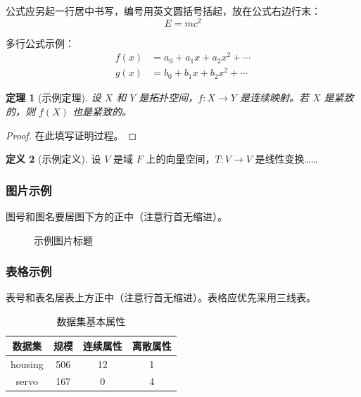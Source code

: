 \documentclass[a4paper,12pt,openright]{book}
\newtheorem{thm}{定理}[section]
\theoremstyle{definition}
\newtheorem{dfn}[thm]{定义}
\theoremstyle{remark}
\begin{document}
公式应另起一行居中书写，编号用英文圆括号括起，放在公式右边行末：
\begin{equation}
    E = mc^{2}
\end{equation}

多行公式示例：
\begin{align}
    f(x) &= a_{0} + a_{1}x + a_{2}x^{2} + \cdots \\
    g(x) &= b_{0} + b_{1}x + b_{2}x^{2} + \cdots
\end{align}

\begin{thm}[示例定理]
    设 $X$ 和 $Y$ 是拓扑空间，$f: X \to Y$ 是连续映射。若 $X$ 是紧致的，则 $f(X)$ 也是紧致的。
\end{thm}

\begin{proof}
    在此填写证明过程。
\end{proof}

\begin{dfn}[示例定义]
    设 $V$ 是域 $F$ 上的向量空间，$T: V \to V$ 是线性变换……
\end{dfn}

\subsubsection*{图片示例}

图号和图名要居图下方的正中（注意行首无缩进）。

\begin{figure}[htbp]
    \centering
    \caption{示例图片标题}
    \label{fig:example}
\end{figure}

\subsubsection*{表格示例}

表号和表名居表上方正中（注意行首无缩进）。表格应优先采用三线表。

\begin{table}[htbp]
    \centering
    \caption{数据集基本属性}
    \label{tab:example}
    \begin{tabular}{cccc}
        \toprule
        \textbf{数据集} & \textbf{规模} & \textbf{连续属性} & \textbf{离散属性} \\
        \midrule
        housing & 506 & 12 & 1 \\
        servo   & 167 & 0  & 4 \\
        \bottomrule
    \end{tabular}
\end{table}
\end{document}

